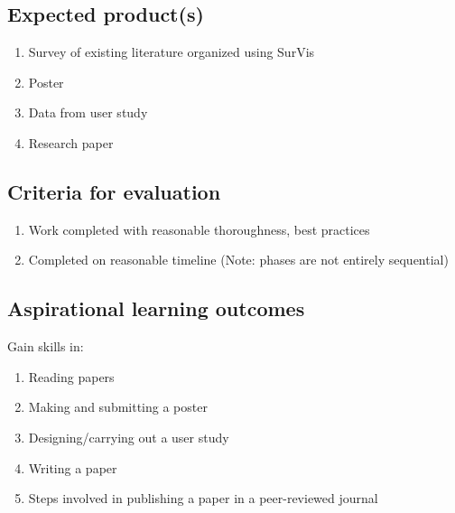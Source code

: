 \documentclass[12pt, twocolumn]{article}
\begin{document}
\subsection{Expected product(s)}
\begin{enumerate}
	\item Survey of existing literature organized using SurVis
	\item Poster
	\item Data from user study
	\item Research paper
\end{enumerate}
\subsection{Criteria for evaluation}
\begin{enumerate}
	\item Work completed with reasonable thoroughness, best practices
	\item Completed on reasonable timeline (Note: phases are not entirely sequential)
\end{enumerate}
\subsection{Aspirational learning outcomes}
Gain skills in:
\begin{enumerate}
	\item Reading papers
	\item Making and submitting a poster
	\item Designing/carrying out a user study
	\item Writing a paper
	\item Steps involved in publishing a paper in a peer-reviewed journal
\end{enumerate}
\end{document}
